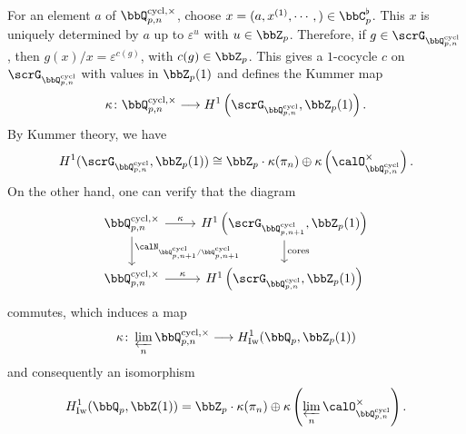 \documentclass[a4paper,oneside]{amsart}
\let\opn\operatorname
\DeclareMathOperator{\cycl}{cycl}
\newcommand{\lto}{\longrightarrow}
\newcommand{\Iw}{\opn{Iw}}
\numberwithin{equation}{section}
\begin{document}
For an element $a$ of $\bbQ_{p,n}^{\cycl,\times}$, choose $x=(a,x^{(1)},\cdots,)\in\bbC_p^\flat$. This $x$ is uniquely determined by $a$ up to $\varepsilon^u$ with $u\in\bbZ_p$. Therefore, if $g\in\scrG_{\bbQ_{p,n}^{\cycl}}$, then
$g(x)/x=\varepsilon^{c(g)}$, with $c(g)\in\bbZ_p$. This gives a $1$-cocycle $c$ on $\scrG_{\bbQ_{p,n}^{\cycl}}$ with values in $\bbZ_p(1)$ and defines the Kummer map
$$\kappa\colon \bbQ_{p,n}^{\cycl,\times}\lto H^1\left(\scrG_{\bbQ_{p,n}^{\cycl}},\bbZ_p(1)\right).$$
By Kummer theory, we have
$$H^1(\scrG_{\bbQ_{p,n}^{\cycl}},\bbZ_p(1))\cong\bbZ_p\cdot\kappa(\pi_n)\oplus \kappa\left(\calO_{\bbQ_{p,n}^{\cycl}}^\times\right).$$
On the other hand, one can verify that the diagram
$$\begin{tikzcd}
        \bbQ_{p,n}^{\cycl,\times}\ar[r,"\kappa"]\ar[d,"\calN_{\bbQ_{p,n+1}^{\cycl}/\bbQ_{p,n+1}^{\cycl}}"]&H^1\left(\scrG_{\bbQ_{p,n+1}^{\cycl}},\bbZ_p(1)\right)\ar[d,"\opn{cores}"]\\
        \bbQ_{p,n}^{\cycl,\times}\ar[r,"\kappa"]&H^1\left(\scrG_{\bbQ_{p,n}^{\cycl}},\bbZ_p(1)\right)
    \end{tikzcd}$$
commutes, which induces a map
$$\kappa\colon \varprojlim_n \bbQ_{p,n}^{\cycl,\times}\lto H_{\Iw}^1(\bbQ_p,\bbZ_p(1))$$
and consequently an isomorphism
$$H_{\Iw}^1(\bbQ_p,\bbZ(1))=\bbZ_p\cdot\kappa(\pi_n)\oplus\kappa\left(\varprojlim_n\calO_{\bbQ_{p,n}^{\cycl}}^\times\right).$$
\end{document}
